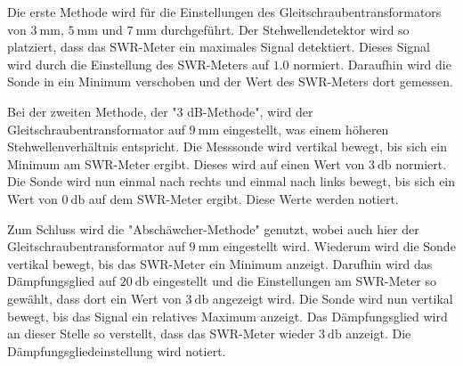 Die erste Methode wird für die Einstellungen des Gleitschraubentransformators von $\SI{3}{\milli\metre}$, $\SI{5}{\milli\metre}$ und $\SI{7}{\milli\metre}$ durchgeführt.
Der Stehwellendetektor wird so platziert, dass das SWR-Meter ein maximales Signal detektiert.
Dieses Signal wird durch die Einstellung des SWR-Meters auf $\num{1.0}$ normiert.
Daraufhin wird die Sonde in ein Minimum verschoben und der Wert des SWR-Meters dort gemessen.

Bei der zweiten Methode, der "3 dB-Methode", wird der Gleitschraubentransformator auf $\SI{9}{\milli\metre}$ eingestellt, was einem höheren Stehwellenverhältnis entspricht.
Die Messsonde wird vertikal bewegt, bis sich ein Minimum am SWR-Meter ergibt.
Dieses wird auf einen Wert von $\SI{3}{\decibel}$ normiert.
Die Sonde wird nun einmal nach rechts und einmal nach links bewegt, bis sich ein Wert von $\SI{0}{\decibel}$ auf dem SWR-Meter ergibt.
Diese Werte werden notiert.

Zum Schluss wird die "Abschäwcher-Methode" genutzt, wobei auch hier der Gleitschraubentransformator auf $\SI{9}{\milli\metre}$ eingestellt wird.
Wiederum wird die Sonde vertikal bewegt, bis das SWR-Meter ein Minimum anzeigt.
Darufhin wird das Dämpfungsglied auf $\SI{20}{\decibel}$ eingestellt und die Einstellungen am SWR-Meter so gewählt, dass dort ein Wert von $\SI{3}{\decibel}$ angezeigt wird.
Die Sonde wird nun vertikal bewegt, bis das Signal ein relatives Maximum anzeigt.
Das Dämpfungsglied wird an dieser Stelle so verstellt, dass das SWR-Meter wieder $\SI{3}{\decibel}$ anzeigt.
Die Dämpfungsgliedeinstellung wird notiert.
